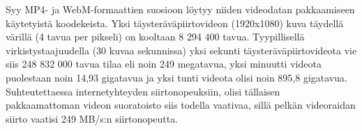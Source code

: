 \documentclass[finnish, 12pt, a4paper, elec, utf8, a-1b, online]{aaltothesis}
\begin{document}
\begin{table}[htb]
  \caption{Suosittuja videoformaatteja ja niiden käyttökohteita. \cite{Can I Use}\cite{Maayan}\cite{Adobe} \label{taulukko2}}
  \centering
\end{table}

\noindent Syy MP4- ja WebM-formaattien suosioon löytyy niiden videodatan pakkaamiseen käytetyistä koodekeista. Yksi täysteräväpiirtovideon (1920x1080) kuva täydellä värillä (4 tavua per pikseli) on kooltaan 8 294 400 tavua. Tyypillisellä virkistystaajuudella (30 kuvaa sekunnissa) yksi sekunti täysteräväpiirtovideota vie siis 248 832 000 tavua tilaa eli noin 249 megatavua, yksi minuutti videota puolestaan noin 14,93 gigatavua ja yksi tunti videota olisi noin 895,8 gigatavua. Suhteutettaessa  internetyhteyden siirtonopeuksiin, olisi tällaisen pakkaamattoman videon suoratoisto siis todella vaativaa, sillä pelkän videoraidan siirto vaatisi 249 MB/s:n siirtonopeutta. \\
\end{document}
